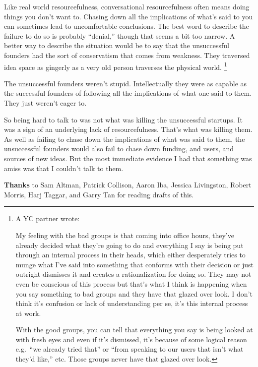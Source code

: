 Like real world resourcefulness, conversational resourcefulness often
means doing things you don't want to. Chasing down all the implications
of what's said to you can sometimes lead to uncomfortable conclusions.
The best word to describe the failure to do so is probably ``denial,''
though that seems a bit too narrow. A better way to describe the
situation would be to say that the unsuccessful founders had the sort of
conservatism that comes from weakness. They traversed idea space as
gingerly as a very old person traverses the physical world.
\footnote{A YC partner wrote:

My feeling with the bad groups is that coming into office hours, they've
already decided what they're going to do and everything I say is being
put through an internal process in their heads, which either desperately
tries to munge what I've said into something that conforms with their
decision or just outright dismisses it and creates a rationalization for
doing so. They may not even be conscious of this process but that's what
I think is happening when you say something to bad groups and they have
that glazed over look. I don't think it's confusion or lack of
understanding per se, it's this internal process at work.

With the good groups, you can tell that everything you say is being
looked at with fresh eyes and even if it's dismissed, it's because of
some logical reason e.g.~``we already tried that'' or ``from speaking to
our users that isn't what they'd like,'' etc. Those groups never have
that glazed over look.}

The unsuccessful founders weren't stupid. Intellectually they were as
capable as the successful founders of following all the implications of
what one said to them. They just weren't eager to.

So being hard to talk to was not what was killing the unsuccessful
startups. It was a sign of an underlying lack of resourcefulness. That's
what was killing them. As well as failing to chase down the implications
of what was said to them, the unsuccessful founders would also fail to
chase down funding, and users, and sources of new ideas. But the most
immediate evidence I had that something was amiss was that I couldn't
talk to them.


\textbf{Thanks} to Sam Altman, Patrick Collison, Aaron Iba, Jessica
Livingston, Robert Morris, Harj Taggar, and Garry Tan for reading drafts
of this.